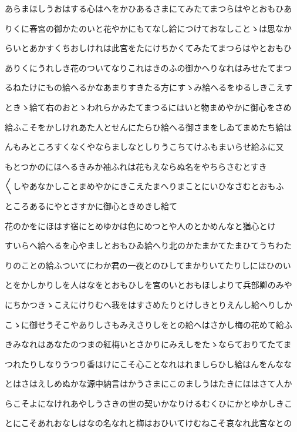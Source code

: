 \documentclass[a4paper,11pt,landscape]{ltjtarticle}
\begin{document}
あらまほしうおはする心はへをかひあるさまにてみたてまつらはやとおもひあ
\par\medskip
りくに春宮の御かたのいと花やかにもてなし給につけておなしことゝは思なか
\par\medskip
らいとあかすくちおしけれは此宮をたにけちかくてみたてまつらはやとおもひ
\par\medskip
ありくにうれしき花のついてなりこれはきのふの御かへりなれはみせたてまつ
\par\medskip
るねたけにもの給へるかなあまりすきたる方にすゝみ給へるをゆるしきこえす
\par\medskip
ときゝ給て右のおとゝわれらかみたてまつるにはいと物まめやかに御心をさめ
\par\medskip
給ふこそをかしけれあた人とせんにたらひ給へる御さまをしゐてまめたち給は
\par\medskip
んもみところすくなくやならましなとしりうこちてけふもまいらせ給ふに又
\par\medskip
もとつかのにほへるきみか袖ふれは花もえならぬ名をやちらさむとすき
\par\medskip
〱しやあなかしことまめやかにきこえたまへりまことにいひなさむとおもふ
\par\medskip
ところあるにやとさすかに御心ときめきし給て
\par\medskip
花のかをにほはす宿にとめゆかは色にめつとや人のとかめんなと猶心とけ
\par\medskip
すいらへ給へるを心やましとおもひゐ給へり北のかたまかてたまひてうちわた
\par\medskip
りのことの給ふついてにわか君の一夜とのひしてまかりいてたりしにほひのい
\par\medskip
とをかしかりしを人はなをとおもひしを宮のいとおもほしよりて兵部卿のみや
\par\medskip
にちかつきゝこえにけりむへ我をはすさめたりとけしきとりえんし給へりしか
\par\medskip
こゝに御せうそこやありしさもみえさりしをとの給へはさかし梅の花めて給ふ
\par\medskip
きみなれはあなたのつまの紅梅いとさかりにみえしをたゝならておりてたてま
\par\medskip
つれたりしなりうつり香はけにこそ心ことなれはれましらひし給はんをんなな
\par\medskip
とはさはえしめぬかな源中納言はかうさまにこのましうはたきにほはさて人か
\par\medskip
らこそよになけれあやしうさきの世の契いかなりけるむくひにかとゆかしきこ
\par\medskip
とにこそあれおなしはなの名なれと梅はおひいてけむねこそ哀なれ此宮なとの
\end{document}
